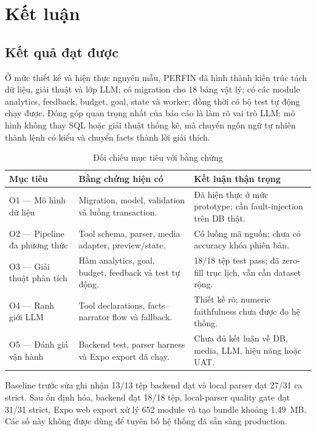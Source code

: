 \chapter{Kết luận}
\label{chap:conclusion}

\section{Kết quả đạt được}

Ở mức thiết kế và hiện thực nguyên mẫu, PERFIN đã hình thành kiến trúc tách dữ liệu, giải thuật và lớp LLM; có migration cho 18 bảng vật lý; có các module analytics, feedback, budget, goal, state và worker; đồng thời có bộ test tự động chạy được. Đóng góp quan trọng nhất của báo cáo là làm rõ vai trò LLM: mô hình không thay SQL hoặc giải thuật thống kê, mà chuyển ngôn ngữ tự nhiên thành lệnh có kiểu và chuyển facts thành lời giải thích.

\begin{table}[H]
  \centering
  \caption{Đối chiếu mục tiêu với bằng chứng}
  \label{tab:objective-evidence}
  \begin{tabularx}{\textwidth}{@{}L{3.6cm}Y Y@{}}
    \toprule
    \textbf{Mục tiêu} & \textbf{Bằng chứng hiện có} & \textbf{Kết luận thận trọng} \\
    \midrule
    O1 --- Mô hình dữ liệu & Migration, model, validation và luồng transaction. & Đã hiện thực ở mức prototype; cần fault-injection trên DB thật. \\
    O2 --- Pipeline đa phương thức & Tool schema, parser, media adapter, preview/state. & Có luồng mã nguồn; chưa có accuracy khóa phiên bản. \\
    O3 --- Giải thuật phân tích & Hàm analytics, goal, budget, feedback và test tự động. & 18/18 tệp test pass; đã zero-fill trục lịch, vẫn cần dataset rộng. \\
    O4 --- Ranh giới LLM & Tool declarations, facts--narrator flow và fallback. & Thiết kế rõ; numeric faithfulness chưa được đo hệ thống. \\
    O5 --- Đánh giá vận hành & Backend test, parser harness và Expo export đã chạy. & Chưa đủ kết luận về DB, media, LLM, hiệu năng hoặc UAT. \\
    \bottomrule
  \end{tabularx}
\end{table}

Baseline trước sửa ghi nhận 13/13 tệp backend đạt và local parser đạt 27/31 ca strict. Sau ổn định hóa, backend đạt 18/18 tệp, local-parser quality gate đạt 31/31 strict, Expo web export xử lý 652 module và tạo bundle khoảng 1,49~MB. Các số này không được dùng để tuyên bố hệ thống đã sẵn sàng production.

